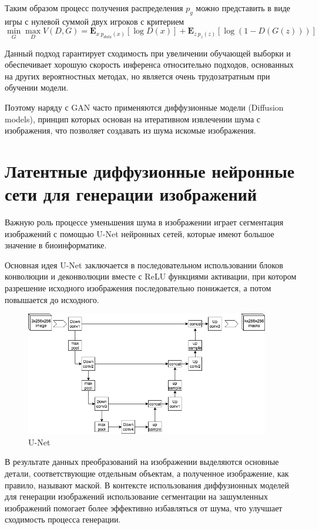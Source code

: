 Таким образом процесс получения распределения $p_g$ можно представить в виде игры с нулевой суммой двух игроков
с критерием 
$$
\min_{G}\max_{D} V(D, G) = \mathbf{E}_{x~p_{data}(x)}[\log D(x)] + \mathbf{E}_{z~p_{z}(z)}[\log (1 - D(G(z)))]
$$ 

Данный подход гарантирует сходимость при увеличении обучающей выборки и обеспечивает хорошую скорость инференса относительно подходов,
основанных на других вероятностных методах, но является очень трудозатратным при обучении модели.

Поэтому наряду с GAN часто применяются диффузионные модели (Diffusion models), принцип которых основан на 
итеративном извлечении шума с изображения, что позволяет создавать из шума искомые изображения.
\section{Латентные диффузионные нейронные сети для генерации изображений}


Важную роль процессе уменьшения шума в изображении играет сегментация изображений с помощью U-Net нейронных сетей,
которые имеют большое значение в биоинформатике.

Основная идея U-Net заключается в последовательном использовании блоков конволюции и деконволюции вместе с ReLU 
функциями активации, при котором разрешение исходного изображения последовательно понижается, а потом повышается
до исходного. 


\begin{figure}[H]
  \centering
  \includegraphics[width=0.95\textwidth]{img/unet.png}
  \caption{U-Net \cite{rombach2022high}}
    \label{fig:latent}
\end{figure}


В результате данных преобразований на изображении выделяются основные детали, соответствующие отдельным объектам, а полученное изображение,
как правило, называют маской. В контексте использования диффузионных моделей для генерации изображений использование
сегментации на зашумленных изображений помогает более эффективно избавляться от шума, что улучшает сходимость процесса генерации.

